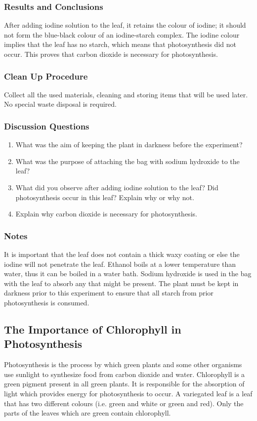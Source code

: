 \subsubsection*{Results and Conclusions}
After adding iodine solution to the leaf, it retains the colour of iodine; it should not form the blue-black colour of an iodine-starch complex. The iodine colour implies that the leaf has no starch, which means that photosynthesis did not occur. This proves that carbon dioxide is necessary for photosynthesis.

\subsubsection*{Clean Up Procedure}
Collect all the used materials, cleaning and storing items that will be used later. No special waste disposal is required.

\subsubsection*{Discussion Questions}
\begin{enumerate}
\item{What was the aim of keeping the plant in darkness before the experiment?}
\item{What was the purpose of attaching the bag with sodium hydroxide to the leaf?}
\item{What did you observe after adding iodine solution to the leaf? Did photosynthesis occur in this leaf? Explain why or why not.}
\item{Explain why carbon dioxide is necessary for photosynthesis.}
\end{enumerate}

\subsubsection*{Notes}
It is important that the leaf does not contain a thick waxy coating or else the iodine will not penetrate the leaf. Ethanol boils at a lower temperature than water, thus it can be boiled in a water bath. Sodium hydroxide is used in the bag with the leaf to absorb any  that might be present. The plant must be kept in darkness prior to this experiment to ensure that all starch from prior photosynthesis is consumed.

\subsection{The Importance of Chlorophyll in Photosynthesis}
Photosynthesis is the process by which green plants and some other organisms use sunlight to synthesize food from carbon dioxide and water. Chlorophyll is a green pigment present in all green plants. It is responsible for the absorption of light which provides energy for photosynthesis to occur. A variegated leaf is a leaf that has two different colours (i.e. green and white or green and red). Only the parts of the leaves which are green contain chlorophyll.


